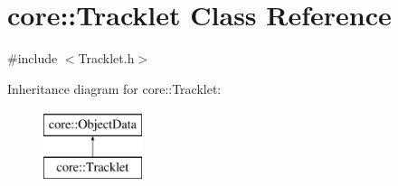 \hypertarget{classcore_1_1Tracklet}{}\section{core\+:\+:Tracklet Class Reference}
\label{classcore_1_1Tracklet}


{\ttfamily \#include $<$Tracklet.\+h$>$}

Inheritance diagram for core\+:\+:Tracklet\+:\begin{figure}[H]
\begin{center}
\leavevmode
\includegraphics[height=2.000000cm]{classcore_1_1Tracklet}
\end{center}
\end{figure}

